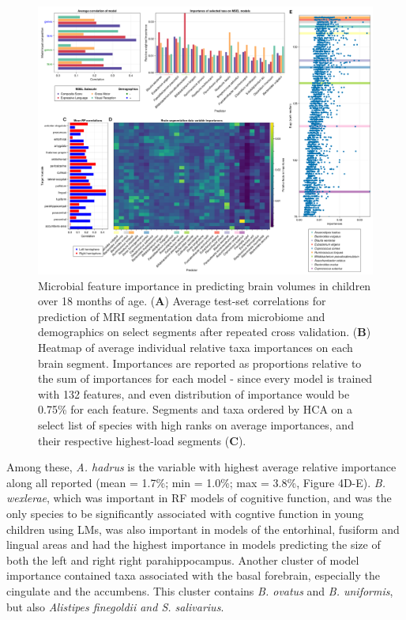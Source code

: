\documentclass{article}
\begin{document}
\begin{figure}
    \centering
    \includegraphics[width=\textwidth]{assets/Figure4.png}
    \caption{
        Microbial feature importance in predicting brain volumes in children over 18 months of age.
        (\textbf{A}) Average test-set correlations for prediction of MRI segmentation
        data from microbiome and demographics on select segments after repeated
        cross validation. (\textbf{B}) Heatmap of average individual relative taxa
        importances on each brain segment. Importances are reported as
        proportions relative to the sum of importances for each model - since
        every model is trained with 132 features, and even distribution of
        importance would be 0.75\% for each feature. Segments and taxa ordered
        by HCA on a select list of species with high ranks on average importances,
        and their respective highest-load segments (\textbf{C}).
    }
    \label{fig:4}
\end{figure}

Among these, \emph{A. hadrus} is the variable with 
highest average relative importance along all reported 
(mean = 1.7\%; min = 1.0\%; max = 3.8\%, Figure 4D-E).
\emph{B. wexlerae}, which was important in RF models of cognitive function,
and was the only species to be significantly associated
with cogntive function in young children using LMs, 
was also important in models of the entorhinal, fusiform and lingual areas
and had the highest importance in models predicting the size of
both the left and right right parahippocampus.
Another cluster of model importance contained taxa associated with the
basal forebrain, especially the cingulate and the accumbens. This
cluster contains \emph{B. ovatus} and \emph{B. uniformis},
but also \emph{Alistipes finegoldii and S. salivarius}.
\end{document}
